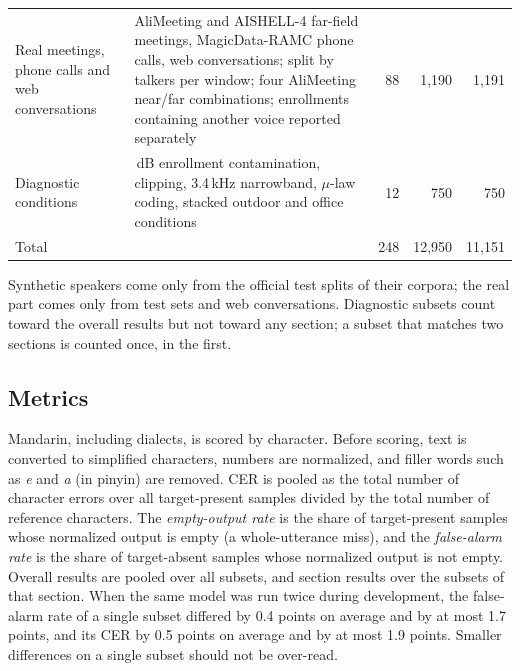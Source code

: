 \begin{table}[t]
\begin{tabularx}{\linewidth}{@{}>{\raggedright\arraybackslash}p{3.0cm}>{\raggedright\arraybackslash}Xrrr@{}}
    Real meetings, phone calls and web conversations & AliMeeting and AISHELL-4 far-field meetings, MagicData-RAMC phone calls, web conversations; split by talkers per window; four AliMeeting near/far combinations; enrollments containing another voice reported separately & 88 & 1{,}190 & 1{,}191 \\
    Diagnostic conditions & 0\,dB enrollment contamination, clipping, 3.4\,kHz narrowband, $\mu$-law coding, stacked outdoor and office conditions & 12 & 750 & 750 \\
    \midrule
    Total & & 248 & 12{,}950 & 11{,}151 \\
    \bottomrule
  \end{tabularx}
  \par\smallskip
  {\footnotesize Synthetic speakers come only from the official test splits of their corpora; the real part comes only from test sets and web conversations. Diagnostic subsets count toward the overall results but not toward any section; a subset that matches two sections is counted once, in the first.\par}
\end{table}

\subsection{Metrics}
\label{subsec:bench_metrics}

Mandarin, including dialects, is scored by character.
Before scoring, text is converted to simplified characters, numbers are normalized, and filler words such as \emph{e} and \emph{a} (in pinyin) are removed.
CER is pooled as the total number of character errors over all target-present samples divided by the total number of reference characters.
The \emph{empty-output rate} is the share of target-present samples whose normalized output is empty (a whole-utterance miss), and the \emph{false-alarm rate} is the share of target-absent samples whose normalized output is not empty.
Overall results are pooled over all subsets, and section results over the subsets of that section.
When the same model was run twice during development, the false-alarm rate of a single subset differed by 0.4 points on average and by at most 1.7 points, and its CER by 0.5 points on average and by at most 1.9 points.
Smaller differences on a single subset should not be over-read.
